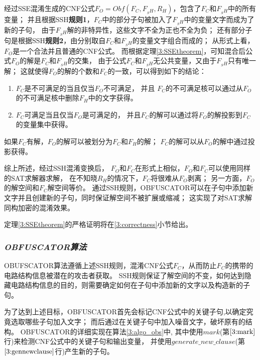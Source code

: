 经过SSE混淆生成的CNF公式$F_O=Obf(F_C,F_{_SH},R_H)$，包含了$F_C$和$F_{_SH}$中的所有变量；
并且根据SSH\textbf{规则1}，$F_C$中的部分子句被加入了$F_{_SH}$中的变量文字而成为了新的子句，
由于$F_{_SH}$解的非特异性，这些文字不全为正也不全为负；
还有部分子句是根据SSH\textbf{规则2}，由分别取自$F_C$和$F_{_SH}$的变量文字组合而成的；
从形式上看，$F_O$是一个合法并且普通的CNF公式。
而根据定理\ref{3:SSEtheorem}，可知混合后公式$F_O$的解是$F_C$和$F_{_SH}$的交集，
由于公式$F_C$和$F_{_SH}$无公共变量，又由于$F_{_SH}$只有唯一解；
这就使得$F_O$的解的个数和$F_C$的一致，可以得到如下的结论：

%
%
\begin{enumerate}
 \item $F_C$是不可满足的当且仅当$F_O$不可满足，
 并且 $F_C$的不可满足核可以通过从$F_O$的不可满足核中删除$F_H$中的文字获得。
 \item $F_C$可满足当且仅当$F_O$是可满足的，
 并且$F_C$的解可以通过将$F_O$的解投影到$F_C$的变量集中获得。
\end{enumerate}

如果$F_C$有解，$F_O$的解可以被划分为$F_C$和$F_H$的解；
$F_C$的解可以从$F_O$的解中通过投影获得。

综上所述，经过SSH混淆变换后，
$F_O$和$F_C$在形式上相似，$F_O$和$F_C$可以使用同样的SAT求解器求解，
在不知晓$R_H$的情况下，$F_C$将很难从$F_O$剥离；
另一方面，$F_O$的解空间和$F_C$解空间等价。
通过SSH规则，OBFUSCATOR可以在子句中添加新文字并且创建新的子句，同时保证解空间不被扩展或缩减；
这实现了对SAT求解同构加密的混淆效果。

定理\ref{3:SSEtheorem}的严格证明将在\ref{3:correctness}小节给出。
\subsubsection{\textsl{OBFUSCATOR算法}}

OBUFSCATOR算法遵循上述SSH规则，混淆CNF公式$F_C$，从而防止$F_C$的携带的电路结构信息被潜在的攻击者获取。
SSH规则保证了解空间的不变，如何达到隐藏电路结构信息的目的，则需要确定如何在子句中添加新的文字以及构造新的子句。

为了达到上述目标，OBFUSCATOR首先会标记CNF公式中的关键子句,以确定究竟选取哪些子句加入文字；
而后通过在关键子句中加入噪音文字，破坏原有的结构。
OBFUSCATOR的详细实现在算法\ref{3:algo_obs}中,
其中使用$mark$(第$\ref{3:mark}$行)来检测CNF公式中的关键子句和输出变量，
并使用$generate\_new\_clause$(第$\ref{3:gennewclause}$行)产生新的子句。

